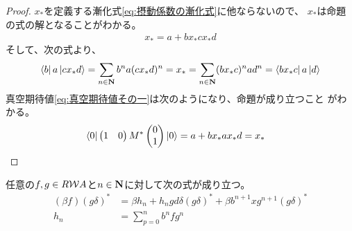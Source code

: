 {\begin{proof}
		$x_*$を定義する漸化式\eqref{eq:摂動係数の漸化式}に他ならないので、
		$x_*$は命題の式の解となることがわかる。
		\begin{equation*}\begin{split}
			x_* = a + bx_*cx_*d
		\end{split}\end{equation*}
		そして、次の式より、
		\begin{equation*}\begin{split}
			\mathinner{\langle{b}|}a\mathinner{|{cx_*d}\rangle} = \sum_{n\in\mathbf{N}}b^na(cx_*d)^n 
			= x_* = \sum_{n\in\mathbf{N}}(bx_*c)^nad^n = \mathinner{\langle{bx_*c}|}a\mathinner{|{d}\rangle}
		\end{split}\end{equation*}
		真空期待値\eqref{eq:真空期待値その一}は次のようになり、命題が成り立つこと
		がわかる。
		\begin{equation*}\begin{split}
			\mathinner{\langle{0}|}\begin{pmatrix}
				1 & 0
			\end{pmatrix}M^*\begin{pmatrix}
				0 \\ 1
			\end{pmatrix}\mathinner{|{0}\rangle} &= a + bx_*ax_*d = x_*
		\end{split}\end{equation*}
	\end{proof} %
	\begin{todo}[保留]\label{todo:保留} %
	任意の$f,g\in R{{\mathcal{W}}} A$と$n\in\mathbf{N}$に対して次の式が成り立つ。
	\begin{equation*}\begin{split}
		(\beta f)(g\delta)^* &= \beta h_n + h_ngd\delta(g\delta)^*
			+ \beta b^{n+1}xg^{n+1}(g\delta)^* \\
		h_n &= \sum_{p=0}^nb^nfg^n \\
	\end{split}\end{equation*}
	\end{todo} %
}\endgroup %
